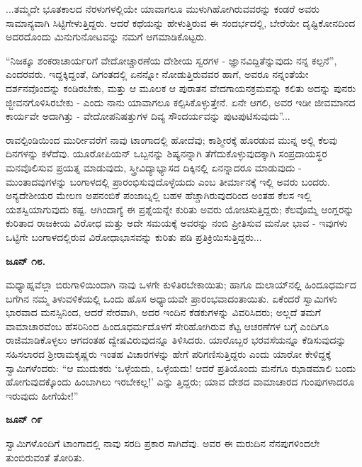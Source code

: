 ...ತಮ್ಮದೇ ಭೂತಕಾಲದ ನೆರಳುಗಳಲ್ಲಿಯೇ ಯಾವಾಗಲೂ ಮುಳುಗಿಹೋಗಿರುವವರನ್ನು ಕಂಡರೆ ಅವರು ಸಾಮಾನ್ಯವಾಗಿ ಸಿಟ್ಟಿಗೇಳುತ್ತಿದ್ದರು. ಆದರೆ ಕಥೆಯನ್ನು ಹೇಳುತ್ತಿರುವ ಈ ಸಂದರ್ಭದಲ್ಲಿ, ಬೇರೆಯೇ ದೃಷ್ಟಿಕೋನದಿಂದ ಅದರದೊಂದು ಮಿನುಗುನೋಟವನ್ನು ನಮಗೆ ಆಗಮಾಡಿಕೊಟ್ಟರು.

“ನಿಜಕ್ಕೂ ಶಂಕರಾಚಾರ್ಯರಿಗೆ ವೇದೋಚ್ಚಾರಣೆಯ ದೇಶೀಯ ಸ್ವರಗಳ - ಜ್ಞಾನವಿದ್ದಿತೆನ್ನುವುದು ನನ್ನ ಕಲ್ಪನೆ”, ಎಂದರವರು. ಇದ್ದಕ್ಕಿದ್ದಂತೆ, ದಿಗಂತದಲ್ಲಿ ಏನನ್ನೋ ನೋಡುತ್ತಿರುವವರ ಹಾಗೆ, ಅವರೂ ನನ್ನಂತೆಯೇ ದರ್ಶನವೊಂದನ್ನು ಕಂಡಿರಬೇಕು, ಮತ್ತು ಆ ಮೂಲಕ ಆ ಪುರಾತನ ವೇದಗಾಯನಕ್ರಮವನ್ನು ಕಲಿತು ಅದನ್ನು ಪುನರು ಜ್ಜೀವನಗೊಳಿಸಿರಬೇಕು - ಎಂದು ನಾನು ಯಾವಾಗಲೂ ಕಲ್ಪಿಸಿಕೊಳ್ಳುತ್ತೇನೆ. ಏನೇ ಆಗಲಿ, ಅವರ ಇಡೀ ಜೀವಮಾನದ ಕಾರ್ಯವೇ ಅದಾಗಿತ್ತು - ವೇದೋಪನಿಷತ್ತುಗಳ ದಿವ್ಯ ಸೌಂದರ್ಯವನ್ನು ಪುಟಪುಟಿಸುವುದು”...

ರಾವಲ್ಪಿಂಡಿಯಿಂದ ಮುರ್ರೀವರೆಗೆ ನಾವು ಟಾಂಗಾದಲ್ಲಿ ಹೋದೆವು; ಕಾಶ್ಮೀರಕ್ಕೆ ಹೊರಡುವ ಮುನ್ನ ಅಲ್ಲಿ ಕೆಲವು ದಿನಗಳನ್ನು ಕಳೆದೆವು. ಯೂರೋಪಿಯನ್ ಒಬ್ಬನನ್ನು ಶಿಷ್ಯನನ್ನಾಗಿ ತೆಗೆದುಕೊಳ್ಳುವುದಕ್ಕಾಗಿ ಸಂಪ್ರದಾಯಸ್ಥರ ಮನವೊಲಿಸುವ ಪ್ರಯತ್ನ ಮಾಡುವುದು, ಸ್ತ್ರೀವಿದ್ಯಾಭ್ಯಾಸದ ದಿಕ್ಕಿನಲ್ಲಿ ಏನನ್ನಾದರೂ ಮಾಡುವುದು - ಮುಂತಾದವುಗಳನ್ನು ಬಂಗಾಳದಲ್ಲಿ ಪ್ರಾರಂಭಿಸುವುದೊಳ್ಳೆಯದು ಎಂಬ ತೀರ್ಮಾನಕ್ಕೆ ಇಲ್ಲಿ ಅವರು ಬಂದರು. ಅನ್ಯದೇಶೀಯರ ಮೇಲಣ ಅಪನಂಬಿಕೆ ಪಂಜಾಬ್ನಲ್ಲಿ ಬಹಳ ಹೆಚ್ಚಾಗಿರುವುದರಿಂದ ಅಂತಹ ಕೆಲಸ ಇಲ್ಲಿ ಯಶಸ್ವಿಯಾಗುವುದು ಕಷ್ಟ. ಆಗಿಂದಾಗ್ಯೆ ಈ ಪ್ರಶ್ನೆಯನ್ನೇ ಕುರಿತು ಅವರು ಯೋಚಿಸುತ್ತಿದ್ದರು; ಕೆಲವೊಮ್ಮೆ ಆಂಗ್ಲರನ್ನು ಕುರಿತಾದ ರಾಜಕೀಯ ವಿರೋಧ ಮತ್ತು ಅದೇ ಸಮಯಕ್ಕೆ ಅವರನ್ನು ನಂಬಿ ಪ್ರೀತಿಸುವ ಮನೋ ಭಾವ - ಇವುಗಳು ಒಟ್ಟಿಗೇ ಬಂಗಾಳದಲ್ಲಿರುವ ವಿರೋಧಾಭಾಸವನ್ನು ಕುರಿತು ಪಡಿ ಪ್ರತಿಕ್ರಿಯಿಸುತ್ತಿದ್ದರು...

\textbf{ಜೂನ್ ೧೮.}

ಮಧ್ಯಾಹ್ನವೆಲ್ಲಾ ಬಿರುಗಾಳಿಯಿಂದಾಗಿ ನಾವು ಒಳಗೇ ಕುಳಿತಿರಬೇಕಾಯಿತು; ಹಾಗೂ ದುಲಾಯ್​ನಲ್ಲಿ ಹಿಂದೂಧರ್ಮದ ಬಗೆಗಿನ ನಮ್ಮ ತಿಳುವಳಿಕೆಯಲ್ಲಿ ಒಂದು ಹೊಸ ಅಧ್ಯಾಯವೇ ಪ್ರಾರಂಭವಾದಂತಾಯಿತು. ಏಕೆಂದರೆ ಸ್ವಾಮಿಗಳು ಭಾರವಾದ ಮನಸ್ಸಿನಿಂದ, ಆದರೆ ನೇರವಾಗಿ, ಅದರ ಇಂದಿನ ಕೆಡಕುಗಳನ್ನು ವಿವರಿಸಿದರು; ಅಲ್ಲದೆ ತಮಗೆ ವಾಮಾಚಾರವೆಂಬ ಹೆಸರಿನಿಂದ ಹಿಂದೂಧರ್ಮದೊಳಗೆ ಸೇರಿಹೋಗಿರುವ ಕೆಟ್ಟ ಆಚರಣೆಗಳ ಬಗ್ಗೆ ಎಂದಿಗೂ ರಾಜಿಮಾಡಿಕೊಳ್ಳಲು ಆಗದಂತಹ ದ್ವೇಷವಿರುವುದನ್ನೂ ತಿಳಿಸಿದರು. ಯಾರೊಬ್ಬರ ಭರವಸೆಯನ್ನೂ ಕೆಡಿಸುವುದನ್ನು ಸಹಿಸಲಾರದ ಶ‍್ರೀರಾಮಕೃಷ್ಣರು ಇಂತಹ ವಿಚಾರಗಳನ್ನು ಹೇಗೆ ಪರಿಗಣಿಸುತ್ತಿದ್ದರು ಎಂದು ಯಾರೋ ಕೇಳಿದ್ದಕ್ಕೆ ಸ್ವಾಮಿಗಳೆಂದರು: “ಆ ಮುದುಕರು ‘ಒಳ್ಳೆಯದು, ಒಳ್ಳೆಯದು! ಆದರೆ ಪ್ರತಿಯೊಂದು ಮನೆಗೂ ಝಾಡಮಾಲಿ ಬಂದು ಹೋಗುವುದಕ್ಕೊಂದು ಹಿಂಬಾಗಿಲು ಇರಬೇಕಲ್ಲ!’ ಎನ್ನು ತ್ತಿದ್ದರು; ಯಾವ ದೇಶದ ವಾಮಾಚಾರದ ಗುಂಪುಗಳಾದರೂ ಇರುವುದು ಹೀಗೆಯೇ!”

\textbf{ಜೂನ್ ೧೯}

ಸ್ವಾಮಿಗಳೊಂದಿಗೆ ಟಾಂಗಾದಲ್ಲಿ ನಾವು ಸರದಿ ಪ್ರಕಾರ ಸಾಗಿದೆವು. ಅವರ ಈ ಮರುದಿನ ನೆನಪುಗಳಿಂದಲೇ ತುಂಬಿರುವಂತೆ ತೋರಿತು.

